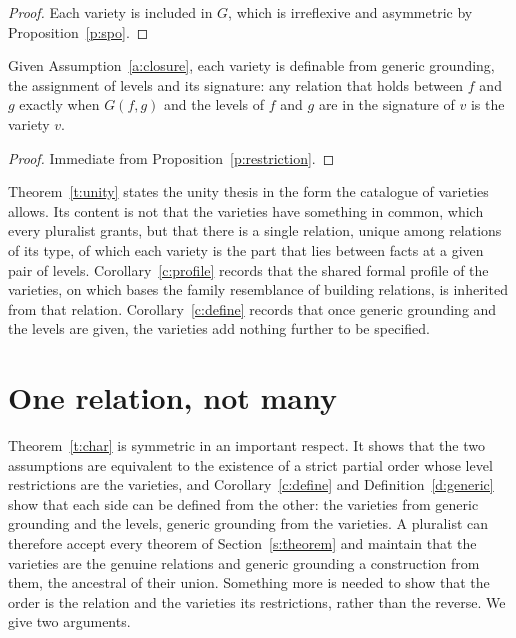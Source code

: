 \documentclass{situationist-preprint}
\begin{document}
\begin{proof}
Each variety is included in $G$, which is irreflexive and asymmetric by Proposition~\ref{p:spo}.
\end{proof}

\begin{corollary}[Definability]\label{c:define}
Given Assumption~\ref{a:closure}, each variety is definable from generic grounding, the assignment of levels and its signature: any relation that holds between $f$ and $g$ exactly when $G(f,g)$ and the levels of $f$ and $g$ are in the signature of $v$ is the variety $v$.
\end{corollary}

\begin{proof}
Immediate from Proposition~\ref{p:restriction}.
\end{proof}

Theorem~\ref{t:unity} states the unity thesis in the form the catalogue of varieties allows. Its content is not that the varieties have something in common, which every pluralist grants, but that there is a single relation, unique among relations of its type, of which each variety is the part that lies between facts at a given pair of levels. Corollary~\ref{c:profile} records that the shared formal profile of the varieties, on which \citet{Bennett2017} bases the family resemblance of building relations, is inherited from that relation. Corollary~\ref{c:define} records that once generic grounding and the levels are given, the varieties add nothing further to be specified.

\section{One relation, not many}\label{s:one}

Theorem~\ref{t:char} is symmetric in an important respect. It shows that the two assumptions are equivalent to the existence of a strict partial order whose level restrictions are the varieties, and Corollary~\ref{c:define} and Definition~\ref{d:generic} show that each side can be defined from the other: the varieties from generic grounding and the levels, generic grounding from the varieties. A pluralist can therefore accept every theorem of Section~\ref{s:theorem} and maintain that the varieties are the genuine relations and generic grounding a construction from them, the ancestral of their union. Something more is needed to show that the order is the relation and the varieties its restrictions, rather than the reverse. We give two arguments.
\end{document}

